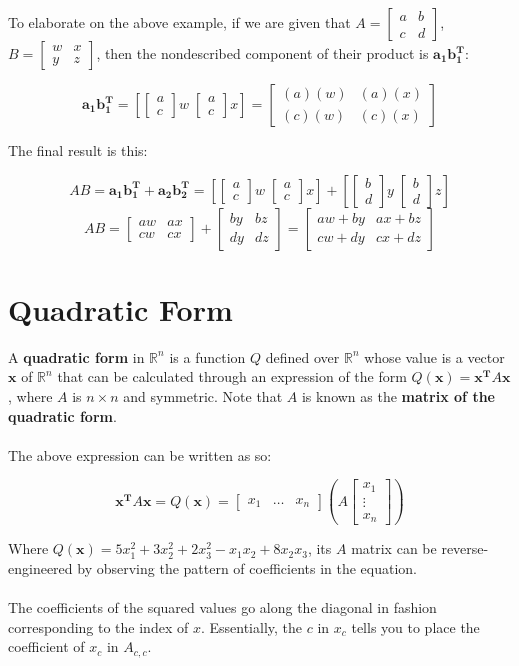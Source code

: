 \documentclass[12pt]{article}
\newcommand{\R}{\mathbb{R}}
\newcommand{\bt}[1]{\textbf{{#1}}}
\newcommand{\bm}[1]{\mathbf{{#1}}}
\newcommand{\mb}{\begin{bmatrix}}
\newcommand{\me}{\end{bmatrix}}
\begin{document}
To elaborate on the above example, if we are given that $A = \mb a & b \\ c & d \me$, $B = \mb w & x \\ y & z \me$, then the nondescribed component of their product
is  $\bm{a_1 b_1^T}$:

$$\bm{a_1 b_1^T} = [\mb a \\ c \me w \; \mb a \\ c \me x] = \mb (a)(w) & (a)(x) \\ (c)(w) & (c)(x) \me$$

The final result is this:

$$AB = \bm{a_1 b_1^T} + \bm{a_2 b_2^T} = [\mb a \\ c \me w \; \mb a \\ c \me x] + [\mb b \\ d \me y \; \mb b \\ d \me z]$$
$$AB = \mb aw & ax \\ cw & cx \me + \mb by & bz \\ dy & dz \me = \mb aw + by & ax + bz \\ cw + dy & cx + dz \me$$

\section*{Quadratic Form}

A \bt{quadratic form} in $\R^n$ is a function $Q$ defined over $\R^n$
whose value is a vector $\bm{x}$ of $\R^n$ that can be calculated through an expression
of the form $Q(\bm{x}) = \bm{x^T}A\bm{x}$, where $A$ is $n \times n$ and symmetric.
Note that $A$ is known as the \bt{matrix of the quadratic form}. \\ \\

The above expression can be written as so:

$$\bm{x^T}A\bm{x} = Q(\bm{x}) = \mb x_1 & \dots & x_n \me (A \mb x_1 \\ \vdots \\ x_n \me)$$

Where $Q(\bm{x}) = 5x_1^2 + 3x_2^2 + 2x_3^2 -x_1x_2 + 8x_2x_3$, its $A$
matrix can be reverse-engineered by observing the pattern of coefficients in the
equation. \\ \\

The coefficients of the squared values go along the diagonal
in fashion corresponding to the index of $x$. Essentially, the $c$ in $x_c$ tells you
to place the coefficient of $x_c$ in $A_{c,c}$. \\ \\
\end{document}
